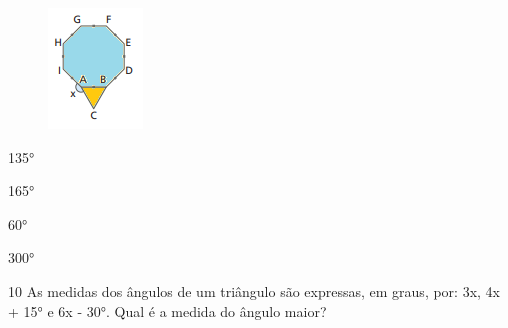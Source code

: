 \begin{figure}[H]
\centering\includegraphics[width=0.98958in,height=1.26042in]{./imgSAEB_8_MAT/media/image56.png}
\end{figure}


\begin{escolha}
\item 135°
\item 165°
\item 60°
\item 300°
\end{escolha}













\num{10} As medidas dos ângulos de um triângulo são expressas, em graus, por:
3x, 4x + 15° e 6x - 30°. Qual é a medida do ângulo maior?

